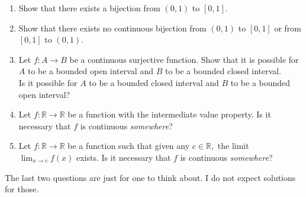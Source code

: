 \documentclass{article}
\begin{document}
\begin{enumerate}
	\item Show that there exists a bijection from $(0, 1)$ to $[0, 1].$
	\item Show that there exists no continuous bijection from $(0, 1)$ to $[0, 1]$ or from $[0, 1]$ to $(0, 1).$
	\item Let $f:A\to B$ be a continuous surjective function. Show that it is possible for $A$ to be a bounded open interval and $B$ to be a bounded closed interval.\\
	Is it possible for $A$ to be a bounded closed interval and $B$ to be a bounded open interval?
	\item Let $f:\mathbb{R}\to\mathbb{R}$ be a function with the intermediate value property. Is it necessary that $f$ is continuous \emph{somewhere}?
	\item Let $f:\mathbb{R}\to\mathbb{R}$ be a function such that given any $c \in \mathbb{R},$ the limit $\displaystyle\lim_{x\to c}f(x)$ exists. Is it necessary that $f$ is continuous \emph{somewhere}?
\end{enumerate}
The last two questions are just for one to think about. I do not expect solutions for those.
\end{document}

